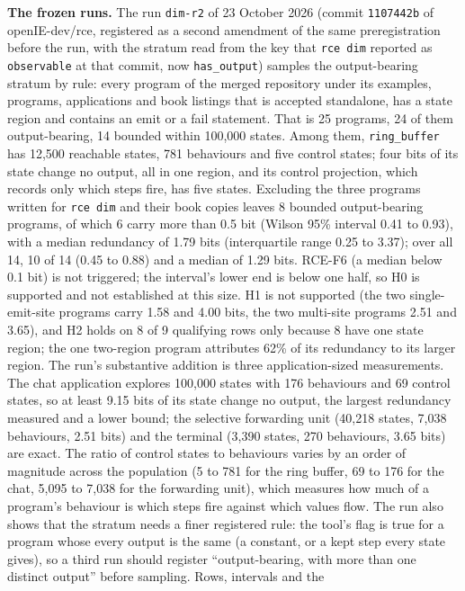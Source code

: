 \documentclass[10pt,letterpaper]{article}
\begin{document}
\textbf{The frozen runs.} The run \texttt{dim-r2} of 23 October 2026
(commit \texttt{1107442b} of openIE-dev/rce, registered as a second
amendment of the same preregistration before the run, with the stratum
read from the key that \texttt{rce\ dim} reported as \texttt{observable}
at that commit, now \texttt{has\_output}) samples the output-bearing
stratum by rule: every program of the merged repository under its
examples, programs, applications and book listings that is accepted
standalone, has a state region and contains an emit or a fail statement.
That is 25 programs, 24 of them output-bearing, 14 bounded within
100,000 states. Among them, \texttt{ring\_buffer} has 12,500 reachable
states, 781 behaviours and five control states; four bits of its state
change no output, all in one region, and its control projection, which
records only which steps fire, has five states. Excluding the three
programs written for \texttt{rce\ dim} and their book copies leaves 8
bounded output-bearing programs, of which 6 carry more than 0.5 bit
(Wilson 95\% interval 0.41 to 0.93), with a median redundancy of 1.79
bits (interquartile range 0.25 to 3.37); over all 14, 10 of 14 (0.45 to
0.88) and a median of 1.29 bits. RCE-F6 (a median below 0.1 bit) is not
triggered; the interval's lower end is below one half, so H0 is
supported and not established at this size. H1 is not supported (the two
single-emit-site programs carry 1.58 and 4.00 bits, the two multi-site
programs 2.51 and 3.65), and H2 holds on 8 of 9 qualifying rows only
because 8 have one state region; the one two-region program attributes
62\% of its redundancy to its larger region. The run's substantive
addition is three application-sized measurements. The chat application
explores 100,000 states with 176 behaviours and 69 control states, so at
least 9.15 bits of its state change no output, the largest redundancy
measured and a lower bound; the selective forwarding unit (40,218
states, 7,038 behaviours, 2.51 bits) and the terminal (3,390 states, 270
behaviours, 3.65 bits) are exact. The ratio of control states to
behaviours varies by an order of magnitude across the population (5 to
781 for the ring buffer, 69 to 176 for the chat, 5,095 to 7,038 for the
forwarding unit), which measures how much of a program's behaviour is
which steps fire against which values flow. The run also shows that the
stratum needs a finer registered rule: the tool's flag is true for a
program whose every output is the same (a constant, or a kept step every
state gives), so a third run should register ``output-bearing, with more
than one distinct output'' before sampling. Rows, intervals and the
\end{document}
